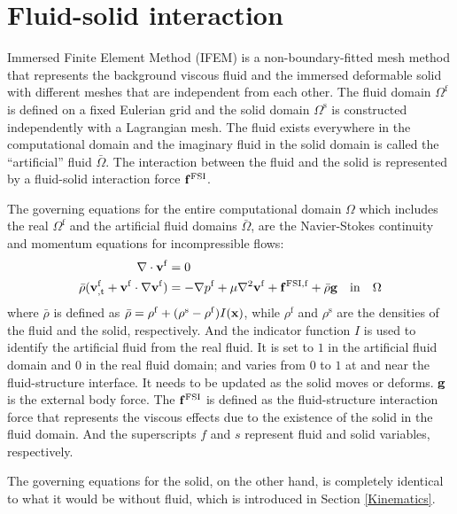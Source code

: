 \section{Fluid-solid interaction}
Immersed Finite Element Method (IFEM) is a non-boundary-fitted mesh method that represents the background viscous fluid and the immersed deformable solid with different meshes that are independent from each other. The fluid domain $\Omega^\mathrm{f}$ is defined on a fixed Eulerian grid and the solid domain $\Omega^\mathrm{s}$ is constructed independently with a Lagrangian mesh. The fluid exists everywhere in the computational domain and the imaginary fluid in the solid domain is called the ``artificial'' fluid $\bar\Omega$. The interaction between the fluid and the solid is represented by a fluid-solid interaction force $\bold{f}^\mathrm{FSI}$.

The governing equations for the entire computational domain $\Omega$ which includes the real $\Omega^\mathrm{f}$ and the artificial fluid domains $\bar\Omega$, are the Navier-Stokes continuity and momentum equations for incompressible flows:
\begin{subequations} \label{NS}
\begin{align}
\nabla \cdot \bold{v}^\mathrm{f} &= 0 \\
\bar\rho (\bold{v}_{, \mathrm{t}}^\mathrm{f} + \bold{v}^\mathrm{f} \cdot \nabla\bold{v}^\mathrm{f}) &= -\nabla p^\mathrm{f} + \mu\nabla^2 \bold{v}^\mathrm{f} + \bold{f}^\mathrm{FSI,f} + \bar\rho\bold{g} \quad \mathrm{in} \quad \Omega 
\end{align}
\end{subequations}
where  $\bar\rho$ is defined as $\bar\rho = \rho^\mathrm{f} + (\rho^\mathrm{s} - \rho^\mathrm{f})I(\bold{x})$, while $\rho^\mathrm{f}$ and $\rho^\mathrm{s}$ are the densities of the fluid and the solid, respectively. And the indicator function $I$ is used to identify the artificial fluid from the real fluid. It is set to $1$ in the artificial fluid domain and $0$ in the real fluid domain; and varies from $0$ to $1$ at and near the fluid-structure interface. It needs to be updated as the solid moves or deforms. $\bold{g}$ is the external body force. The $\bold{f}^\mathrm{FSI}$ is defined as the fluid-structure interaction force that represents the viscous effects due to the existence of the solid in the fluid domain. And the superscripts $f$ and $s$ represent fluid and solid variables, respectively. 

The governing equations for the solid, on the other hand, is completely identical to what it would be without fluid, which is introduced in Section \ref{Kinematics}.

